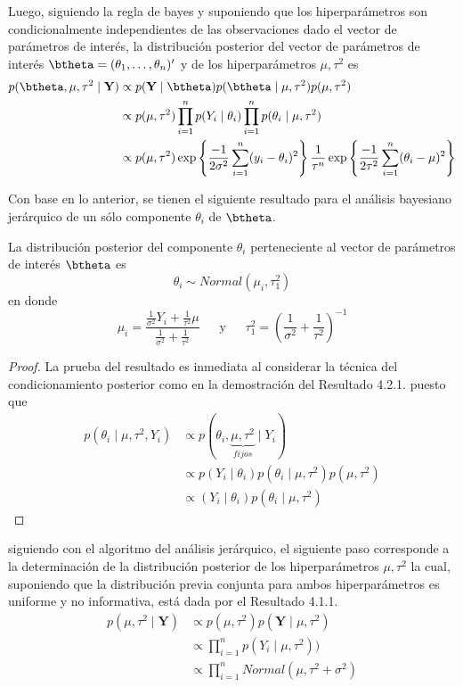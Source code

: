 \documentclass[10pt,openright]{book}\usepackage[]{graphicx}\usepackage[]{color}
\begin{document}
Luego, siguiendo la regla de bayes y suponiendo que los hiperpar\'ametros son condicionalmente independientes de las observaciones dado el vector de par\'ametros de inter\'es, la distribuci\'on posterior del vector de par\'ametros de inter\'es $\btheta=(\theta_1,\ldots,\theta_n)'$ y de los hiperpar\'ametros $\mu, \tau^2$ es
\begin{align*}
p(\btheta,\mu,\tau^2 \mid \mathbf{Y})
&\propto p(\mathbf{Y} \mid \btheta)p(\btheta \mid \mu,\tau^2)p(\mu,\tau^2)  \\
&\propto p(\mu,\tau^2) \prod_{i=1}^n p(Y_i \mid \theta_i) \prod_{i=1}^n p(\theta_i \mid \mu,\tau^2)  \\
&\propto p(\mu,\tau^2) \exp\left\{\frac{-1}{2\sigma^2}\sum_{i=1}^n(y_i-\theta_i)^2\right\}
\frac{1}{\tau^n}\exp\left\{\frac{-1}{2\tau^2}\sum_{i=1}^n(\theta_i-\mu)^2\right\}
\end{align*}

Con base en lo anterior, se tienen el siguiente resultado para el an\'alisis bayesiano jer\'arquico de un s\'olo componente $\theta_i$ de $\btheta$.

\begin{Res}
La distribuci\'on posterior del componente $\theta_i$ perteneciente al vector de par\'ametros de inter\'es $\btheta$ es
\begin{equation*}
\theta_i\sim Normal(\mu_i,\tau_1^2)
\end{equation*}
en donde
\begin{equation*}
\mu_i=\frac{\frac{1}{\sigma^2}Y_i+\frac{1}{\tau^2}\mu}{\frac{1}{\sigma^2}+\frac{1}{\tau^2}}
\ \ \ \ \ \ \ \text{y} \ \ \ \ \ \ \
\tau_1^2=\left(\frac{1}{\sigma^2}+\frac{1}{\tau^2}\right)^{-1}
\end{equation*}
\end{Res}

\begin{proof}
La prueba del resultado es inmediata al considerar la t\'ecnica del condicionamiento posterior como en la demostraci\'on del Resultado 4.2.1. puesto que
\begin{align*}
p(\theta_i \mid \mu,\tau^2,Y_i)&\propto
p(\theta_i,\underbrace{\mu,\tau^2}_{fijos} \mid Y_i)\\
&\propto
p(Y_i \mid \theta_i)p(\theta_i \mid \mu,\tau^2)p(\mu,\tau^2)\\
&\propto
(Y_i \mid \theta_i)p(\theta_i \mid \mu,\tau^2)
\end{align*}
\end{proof}

siguiendo con el algoritmo del an\'alisis jer\'arquico, el siguiente paso corresponde a la determinaci\'on de la distribuci\'on posterior de los hiperpar\'ametros $\mu, \tau^2$ la cual, suponiendo que la distribuci\'on previa conjunta para ambos hiperpar\'ametros es uniforme y no informativa, est\'a dada por el Resultado 4.1.1.
\begin{align*}
p(\mu, \tau^2 \mid \mathbf{Y})&\propto p(\mu,\tau^2)p(\mathbf{Y} \mid \mu,\tau^2)\\
&\propto \prod_{i=1}^n p(Y_i \mid \mu,\tau^2))\\
&\propto \prod_{i=1}^n Normal(\mu,\tau^2+\sigma^2)
\end{align*}
\end{document}
